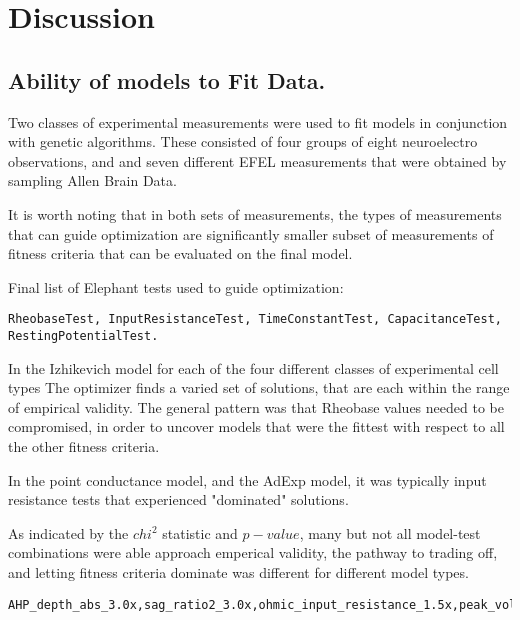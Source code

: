 \section{Discussion}

\subsection{Ability of models to Fit Data.}

Two classes of experimental measurements were used to fit models in conjunction with genetic algorithms. These consisted of four groups of eight neuroelectro observations, and and seven different EFEL measurements that were obtained by sampling Allen Brain Data.

It is worth noting that in both sets of measurements, the types of measurements that can guide optimization are significantly smaller subset of measurements of fitness criteria that can be evaluated on the final model.

Final list of Elephant tests used to guide optimization: 
\begin{verbatim}
RheobaseTest, InputResistanceTest, TimeConstantTest, CapacitanceTest, RestingPotentialTest.
\end{verbatim}

In the Izhikevich model for each of the four different classes of experimental cell types
The optimizer finds a varied set of solutions, that are each within the range of empirical validity. The general pattern was that Rheobase values needed to be compromised, in order to 
uncover models that were the fittest with respect to all the other fitness criteria.

In the point conductance model, and the AdExp model, it was typically input resistance tests that experienced "dominated" solutions. 

As indicated by the $chi^{2}$ statistic and $p-value$, many but not all model-test combinations were able approach emperical validity, the pathway to trading off, and letting fitness criteria dominate was different for different model types.




\begin{verbatim}
AHP_depth_abs_3.0x,sag_ratio2_3.0x,ohmic_input_resistance_1.5x,peak_voltage_3.0x,voltage_base_3.0x,Spikecount_3.0x,ohmic_input_resistance_vb_ssse_1.5x. 
\end{verbatim}

